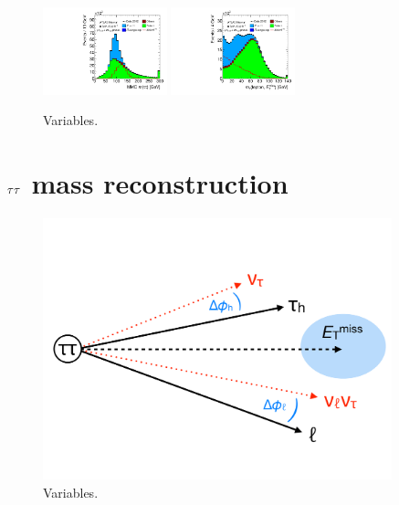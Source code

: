 \begin{figure}[tp]
  \includegraphics[width=0.32\textwidth]{figures/presel/mMMC}
  \includegraphics[width=0.32\textwidth]{figures/presel/mT-hi}
  \caption{Variables.}
  \label{fig:stategy-presel-2}
\end{figure}

\clearpage
\section{$\tau\tau$ mass reconstruction}
\label{sec:strategy-mtautau}

\begin{figure}[tp]
  \centering
  \includegraphics[width=0.90\textwidth]{figures/mtautau/mmc-cartoon}
  \caption{Variables.}
  \label{fig:strategy-mtautau-cartoon}
\end{figure}

